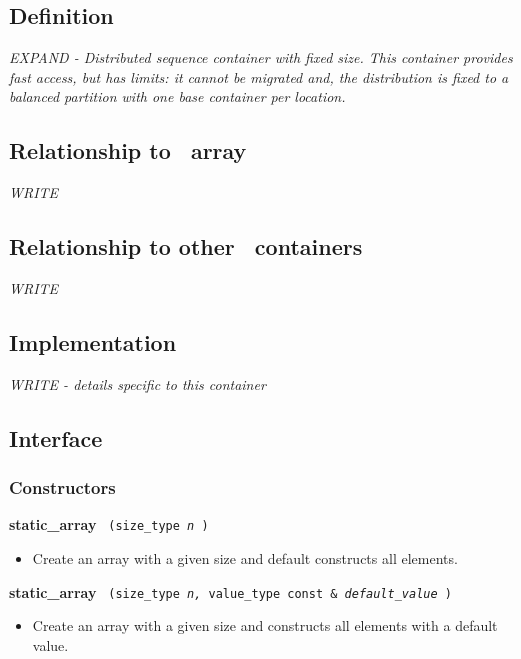 \subsection{Definition}

\textit{EXPAND - Distributed sequence container with fixed size. 
This container provides fast access, but has limits: it cannot be migrated and, the distribution is fixed to a balanced partition with one base container per location.}

\subsection{Relationship to \stl\ array}

\textit{WRITE}

\subsection{Relationship to other \stapl\ containers}

\textit{WRITE}

\subsection{Implementation}

\textit{WRITE - details specific to this container}

\subsection{Interface} \label{sec-stary-cont-inter}

\subsubsection{Constructors}

\noindent
\textbf{static\_array}%
\texttt{%
(size\_type
\textit{n}%
)
}

\begin{itemize}
\item
Create an array with a given size and default constructs all elements. 
\end{itemize}
 
\noindent
\textbf{static\_array}%
\texttt{%
(size\_type 
\textit{n,}%
value\_type const \&
\textit{default\_value}%
)
}

\begin{itemize}
\item
Create an array with a given size and constructs all elements with a default value. 
\end{itemize}
 
